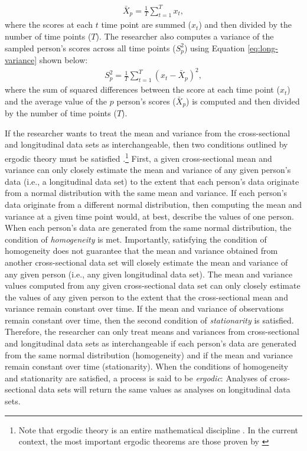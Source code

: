 \documentclass[
12pt, %
twoside,
english]{guelphthesis}
\begin{document}
\begin{align}
\bar{X}_p = \frac{1}{T}\sum^T_{t = 1} x_t,
\label{eq:long-mean}
\end{align}
\noindent where the scores at each \(t\) time point are summed (\(x_t\)) and then divided by the number of time points (\(T\)). The researcher also computes a variance of the sampled person's scores across all time points (\(S^2_p\)) using Equation \ref{eq:long-variance} shown below:
\begin{align}
S^2_p = \frac{1}{T}\sum^T_{t = 1} (x_t - \bar{X}_p)^2,
\label{eq:long-variance}
\end{align}
\noindent where the sum of squared differences between the score at each time point (\(x_t\)) and the average value of the \(p\) person's scores (\(\bar{X}_p\)) is computed and then divided by the number of time points (\(T\)).

If the researcher wants to treat the mean and variance from the cross-sectional and longitudinal data sets as interchangeable, then two conditions outlined by ergodic theory must be satisfied \autocite{molenaar2004,molenaar2009}.\footnote{Note that ergodic theory is an entire mathematical discipline \parencite[for an introduction, see][]{petersen1983}. In the current context, the most important ergodic theorems are those proven by \citeauthor{birkhoff1931} } First, a given cross-sectional mean and variance can only closely estimate the mean and variance of any given person's data (i.e., a longitudinal data set) to the extent that each person's data originate from a normal distribution with the same mean and variance. If each person's data originate from a different normal distribution, then computing the mean and variance at a given time point would, at best, describe the values of one person. When each person's data are generated from the same normal distribution, the condition of \emph{homogeneity} is met. Importantly, satisfying the condition of homogeneity does not guarantee that the mean and variance obtained from another cross-sectional data set will closely estimate the mean and variance of any given person (i.e., any given longitudinal data set). The mean and variance values computed from any given cross-sectional data set can only closely estimate the values of any given person to the extent that the cross-sectional mean and variance remain constant over time. If the mean and variance of observations remain constant over time, then the second condition of \emph{stationarity} is satisfied. Therefore, the researcher can only treat means and variances from cross-sectional and longitudinal data sets as interchangeable if each person's data are generated from the same normal distribution (homogeneity) and if the mean and variance remain constant over time (stationarity). When the conditions of homogeneity and stationarity are satisfied, a process is said to be \emph{ergodic}: Analyses of cross-sectional data sets will return the same values as analyses on longitudinal data sets.
\end{document}
